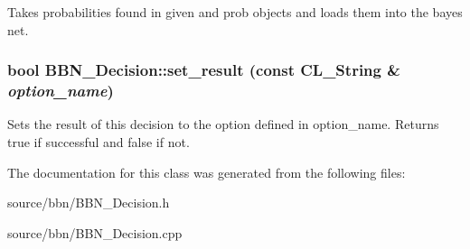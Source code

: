 \label{classBBN__Decision_a1a4ff92ffa1b4c3abba092b07d6f9b93}
Takes probabilities found in given and prob objects and loads them into the bayes net. \hypertarget{classBBN__Decision_a6a2a027baea04cbac8ff81711aac9d76}{
\subsubsection[{set\_\-result}]{\setlength{\rightskip}{0pt plus 5cm}bool BBN\_\-Decision::set\_\-result (const CL\_\-String \& {\em option\_\-name})}}
\label{classBBN__Decision_a6a2a027baea04cbac8ff81711aac9d76}
Sets the result of this decision to the option defined in option\_\-name. Returns true if successful and false if not. 

The documentation for this class was generated from the following files:\begin{DoxyCompactItemize}
\item 
source/bbn/BBN\_\-Decision.h\item 
source/bbn/BBN\_\-Decision.cpp\end{DoxyCompactItemize}
